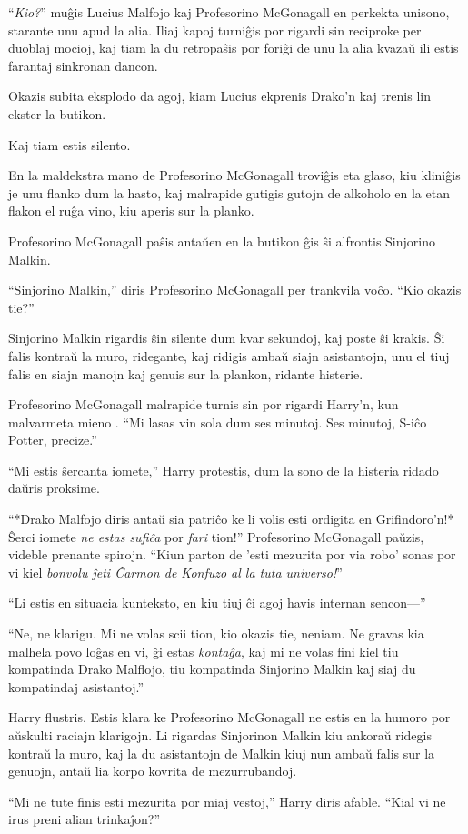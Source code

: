 ``\emph{Kio?}'' muĝis Lucius Malfojo kaj Profesorino McGonagall en
perkekta unisono, starante unu apud la alia. Iliaj kapoj turniĝis por
rigardi sin reciproke per duoblaj mocioj, kaj tiam la du retropaŝis
por foriĝi de unu la alia kvazaŭ ili estis farantaj sinkronan
dancon.

Okazis subita eksplodo da agoj, kiam Lucius ekprenis Drako'n kaj
trenis lin ekster la butikon.

Kaj tiam estis silento.

En la maldekstra mano de Profesorino McGonagall troviĝis eta glaso,
kiu kliniĝis je unu flanko dum la hasto, kaj malrapide gutigis gutojn de
alkoholo en la etan flakon el ruĝa vino, kiu aperis sur la planko.

Profesorino McGonagall paŝis antaŭen en la butikon ĝis ŝi alfrontis
Sinjorino Malkin.

``Sinjorino Malkin,'' diris Profesorino McGonagall per trankvila
voĉo. ``Kio okazis tie?''

Sinjorino Malkin rigardis ŝin silente dum kvar sekundoj, kaj poste ŝi
krakis. Ŝi falis kontraŭ la muro, ridegante, kaj ridigis ambaŭ siajn
asistantojn, unu el tiuj falis en siajn manojn kaj genuis sur la
plankon, ridante histerie.

Profesorino McGonagall malrapide turnis sin por rigardi Harry'n, kun
malvarmeta mieno . ``Mi lasas vin sola dum ses minutoj. Ses minutoj,
S-iĉo Potter, precize.''

``Mi estis ŝercanta iomete,'' Harry protestis, dum la sono de la
histeria ridado daŭris proksime.

``*Drako Malfojo diris antaŭ sia patriĉo ke li volis esti ordigita en
Grifindoro'n!* Ŝerci iomete \emph{ne estas sufiĉa} por \emph{fari}
tion!'' Profesorino McGonagall paŭzis, videble prenante
spirojn. ``Kiun parton de 'esti mezurita por via robo' sonas por vi
kiel \emph{bonvolu ĵeti Ĉarmon de Konfuzo al la tuta universo!}''

``Li estis en situacia kunteksto, en kiu tiuj ĉi agoj havis internan
sencon—''

``Ne, ne klarigu. Mi ne volas scii tion, kio okazis tie, neniam. Ne
gravas kia malhela povo loĝas en vi, ĝi estas \emph{kontaĝa}, kaj mi ne
volas fini kiel tiu kompatinda Drako Malflojo, tiu kompatinda
Sinjorino Malkin kaj siaj du kompatindaj asistantoj.''

Harry flustris. Estis klara ke Profesorino McGonagall ne estis en
la humoro por aŭskulti raciajn klarigojn. Li rigardas Sinjorinon
Malkin kiu ankoraŭ ridegis kontraŭ la muro, kaj la du asistantojn de
Malkin kiuj nun ambaŭ falis sur la genuojn, antaŭ lia korpo kovrita de
mezurrubandoj.

``Mi ne tute finis esti mezurita por miaj vestoj,'' Harry diris
afable. ``Kial vi ne irus preni alian trinkaĵon?''


